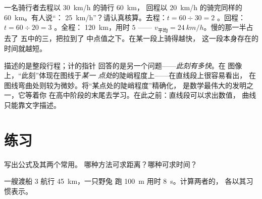 \begin{example}[陷阱揭晓]\label{ex:g7:motion-average-speed:sprung}
一名骑行者去程以 \qty{30}{km/h} 的骑行 \qty{60}{km}，
回程以 \qty{20}{km/h} 的骑完同样的 \qty{60}{km}。有人说“：
\qty{25}{km/h}”？请认真核算。去程：$t = 60 \div 30 = 2$
。回程：$t = 60 \div 20 = 3$ 。全程：
\qty{120}{km}，用时 $5$ ——
$v_{\text{平均}} = \qty{24}{km/h}$。慢的那一半占去了
五中的三，把拉到了
中点值之下。在某一段上骑得越快，
这一段本身存在的时间就越短。
\end{example}

\begin{remark}[速度计说明了什么]\label{rem:g7:motion-average-speed:speedometer}
描述的是整段行程；计的指针
回答的是另一个问题——\emph{此刻有多快}。在
图像上，“此刻”体现在图线于\emph{某一
点处}的陡峭程度上——在直线段上很容易看出，
在图线弯曲处则较为微妙。将“某点处的陡峭程度”精确化，
是数学最伟大的发明之一，它等着你
在高中阶段的末尾去学习。在此之前：直线段可以求出数值，
曲线只能靠文字描述。
\end{remark}

\section{练习}

\begin{exercise}[$\star$]\label{exo:g7:motion-average-speed:1}
写出公式及其两个常用。
哪种方法可求距离？哪种可求时间？
\end{exercise}

\begin{exercise}[$\star$]\label{exo:g7:motion-average-speed:2}
一艘渡船 $3$ 航行 \qty{45}{km}，一只野兔
跑 \qty{100}{m} 用时 \qty{8}{s}。计算两者的，
各以其习惯表示。
\end{exercise}

